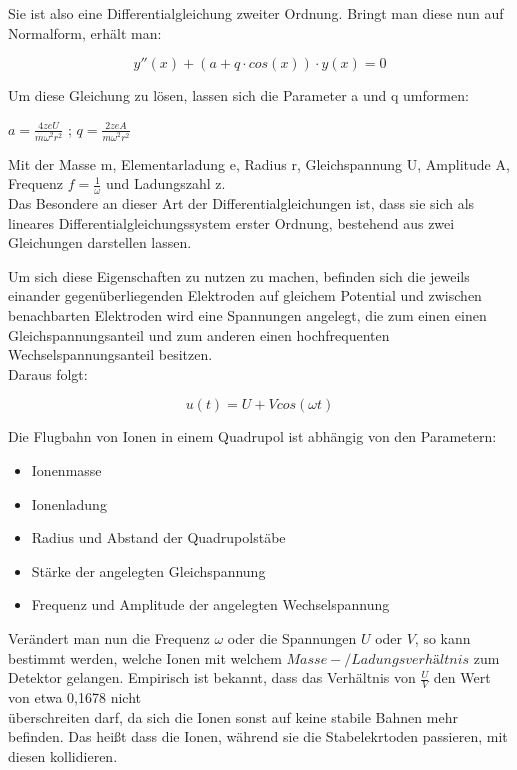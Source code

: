Sie ist also eine Differentialgleichung zweiter Ordnung. Bringt man diese nun auf Normalform, erhält man:

\begin{equation}
y''(x)+(a + q\cdot cos (x)) \cdot y(x) = 0
\end{equation}

Um diese Gleichung zu lösen, lassen sich die Parameter a und q umformen: 
\\
\begin{center}
$a = \frac{4zeU}{m\omega^2 r^2}$ ; $q = \frac{2zeA}{m\omega^2 r^2}$
\end{center}

Mit der Masse m, Elementarladung e, Radius r, Gleichspannung U, Amplitude A, Frequenz $f=\frac{1}{\omega}$ und Ladungszahl z.\\
Das Besondere an dieser Art der Differentialgleichungen ist, dass sie sich als lineares Differentialgleichungssystem erster Ordnung, bestehend aus zwei Gleichungen darstellen lassen.

Um sich diese Eigenschaften zu nutzen zu machen, befinden sich die jeweils einander gegenüberliegenden Elektroden auf gleichem Potential und zwischen benachbarten Elektroden wird eine Spannungen angelegt, die zum einen einen Gleichspannungsanteil und zum anderen einen hochfrequenten Wechselspannungsanteil besitzen.\\
Daraus folgt:

\begin{equation}
u(t)=U+V cos (\omega t)
\end{equation}

Die Flugbahn von Ionen in einem Quadrupol ist abhängig von den Parametern:
\begin{itemize}
\item Ionenmasse
\item Ionenladung
\item Radius und Abstand der Quadrupolstäbe
\item Stärke der angelegten Gleichspannung
\item Frequenz und Amplitude der angelegten Wechselspannung
\end{itemize}
Verändert man nun die Frequenz $\omega$ oder die Spannungen $U$ oder $V$, so kann bestimmt werden, welche Ionen mit welchem $Masse-/Ladungsverhältnis$ zum Detektor gelangen.
Empirisch ist bekannt, dass das Verhältnis von $\frac{U}{V}$ den Wert von etwa 0,1678 nicht\\überschreiten darf, da sich die Ionen sonst auf keine stabile Bahnen mehr befinden. Das heißt dass die Ionen, während sie die Stabelekrtoden passieren, mit diesen kollidieren.

